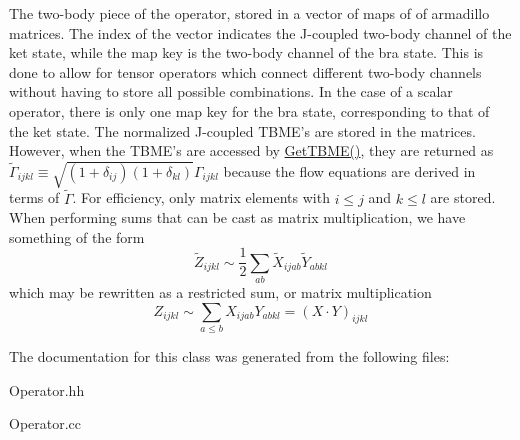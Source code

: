 The two-\/body piece of the operator, stored in a vector of maps of of armadillo matrices. The index of the vector indicates the J-\/coupled two-\/body channel of the ket state, while the map key is the two-\/body channel of the bra state. This is done to allow for tensor operators which connect different two-\/body channels without having to store all possible combinations. In the case of a scalar operator, there is only one map key for the bra state, corresponding to that of the ket state. The normalized J-\/coupled T\-B\-M\-E's are stored in the matrices. However, when the T\-B\-M\-E's are accessed by \hyperlink{classOperator_aaa072b887da84ca14a4968df17ea8812}{Get\-T\-B\-M\-E()}, they are returned as $ \tilde{\Gamma}_{ijkl} \equiv \sqrt{(1+\delta_{ij})(1+\delta_{kl})} \Gamma_{ijkl} $ because the flow equations are derived in terms of $ \tilde{\Gamma} $. For efficiency, only matrix elements with $ i\leq j $ and $ k\leq l $ are stored. When performing sums that can be cast as matrix multiplication, we have something of the form \[ \tilde{Z}_{ijkl} \sim \frac{1}{2} \sum_{ab}\tilde{X}_{ijab} \tilde{Y}_{abkl} \] which may be rewritten as a restricted sum, or matrix multiplication \[ Z_{ijkl} \sim \sum_{a\leq b} X_{ijab} Y_{abkl} = \left( X\cdot Y \right)_{ijkl} \] 

The documentation for this class was generated from the following files\-:\begin{DoxyCompactItemize}
\item 
Operator.\-hh\item 
Operator.\-cc\end{DoxyCompactItemize}
